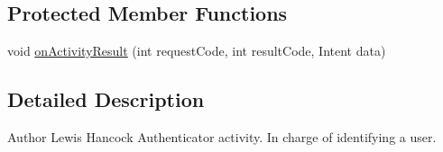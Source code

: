 \subsection*{Protected Member Functions}
\begin{DoxyCompactItemize}
\item 
void \hyperlink{classuk_1_1ac_1_1swan_1_1digitaltrails_1_1accounts_1_1_authenticator_activity_aebc59fcc6d318607ab2866e5ce81859a}{on\+Activity\+Result} (int request\+Code, int result\+Code, Intent data)
\end{DoxyCompactItemize}


\subsection{Detailed Description}
\begin{DoxyAuthor}{Author}
Lewis Hancock Authenticator activity. In charge of identifying a user. 
\end{DoxyAuthor}



